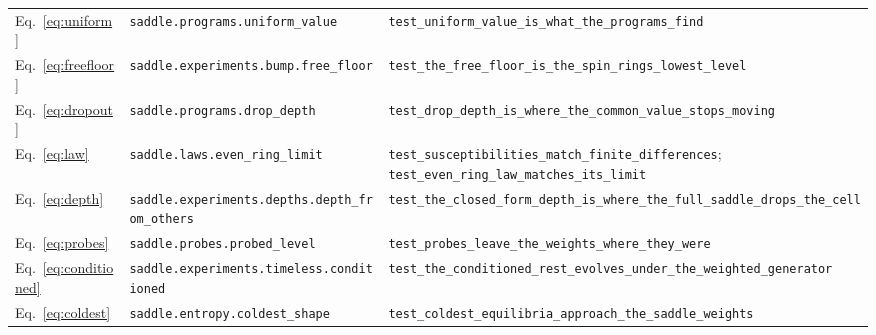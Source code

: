 \begin{tabular}{lp{2.55in}p{3.15in}}
Eq.~\eqref{eq:uniform} & \raggedright \texttt{saddle.\allowbreak{}programs.\allowbreak{}uniform\_\allowbreak{}value} & \raggedright \texttt{test\_\allowbreak{}uniform\_\allowbreak{}value\_\allowbreak{}is\_\allowbreak{}what\_\allowbreak{}the\_\allowbreak{}programs\_\allowbreak{}find} \tabularnewline
Eq.~\eqref{eq:freefloor} & \raggedright \texttt{saddle.\allowbreak{}experiments.\allowbreak{}bump.\allowbreak{}free\_\allowbreak{}floor} & \raggedright \texttt{test\_\allowbreak{}the\_\allowbreak{}free\_\allowbreak{}floor\_\allowbreak{}is\_\allowbreak{}the\_\allowbreak{}spin\_\allowbreak{}rings\_\allowbreak{}lowest\_\allowbreak{}level} \tabularnewline
Eq.~\eqref{eq:dropout} & \raggedright \texttt{saddle.\allowbreak{}programs.\allowbreak{}drop\_\allowbreak{}depth} & \raggedright \texttt{test\_\allowbreak{}drop\_\allowbreak{}depth\_\allowbreak{}is\_\allowbreak{}where\_\allowbreak{}the\_\allowbreak{}common\_\allowbreak{}value\_\allowbreak{}stops\_\allowbreak{}moving} \tabularnewline
Eq.~\eqref{eq:law} & \raggedright \texttt{saddle.\allowbreak{}laws.\allowbreak{}even\_\allowbreak{}ring\_\allowbreak{}limit} & \raggedright \texttt{test\_\allowbreak{}susceptibilities\_\allowbreak{}match\_\allowbreak{}finite\_\allowbreak{}differences}; \texttt{test\_\allowbreak{}even\_\allowbreak{}ring\_\allowbreak{}law\_\allowbreak{}matches\_\allowbreak{}its\_\allowbreak{}limit} \tabularnewline
Eq.~\eqref{eq:depth} & \raggedright \texttt{saddle.\allowbreak{}experiments.\allowbreak{}depths.\allowbreak{}depth\_\allowbreak{}from\_\allowbreak{}others} & \raggedright \texttt{test\_\allowbreak{}the\_\allowbreak{}closed\_\allowbreak{}form\_\allowbreak{}depth\_\allowbreak{}is\_\allowbreak{}where\_\allowbreak{}the\_\allowbreak{}full\_\allowbreak{}saddle\_\allowbreak{}drops\_\allowbreak{}the\_\allowbreak{}cell} \tabularnewline
Eq.~\eqref{eq:probes} & \raggedright \texttt{saddle.\allowbreak{}probes.\allowbreak{}probed\_\allowbreak{}level} & \raggedright \texttt{test\_\allowbreak{}probes\_\allowbreak{}leave\_\allowbreak{}the\_\allowbreak{}weights\_\allowbreak{}where\_\allowbreak{}they\_\allowbreak{}were} \tabularnewline
Eq.~\eqref{eq:conditioned} & \raggedright \texttt{saddle.\allowbreak{}experiments.\allowbreak{}timeless.\allowbreak{}conditioned} & \raggedright \texttt{test\_\allowbreak{}the\_\allowbreak{}conditioned\_\allowbreak{}rest\_\allowbreak{}evolves\_\allowbreak{}under\_\allowbreak{}the\_\allowbreak{}weighted\_\allowbreak{}generator} \tabularnewline
Eq.~\eqref{eq:coldest} & \raggedright \texttt{saddle.\allowbreak{}entropy.\allowbreak{}coldest\_\allowbreak{}shape} & \raggedright \texttt{test\_\allowbreak{}coldest\_\allowbreak{}equilibria\_\allowbreak{}approach\_\allowbreak{}the\_\allowbreak{}saddle\_\allowbreak{}weights} \tabularnewline

\end{tabular}
